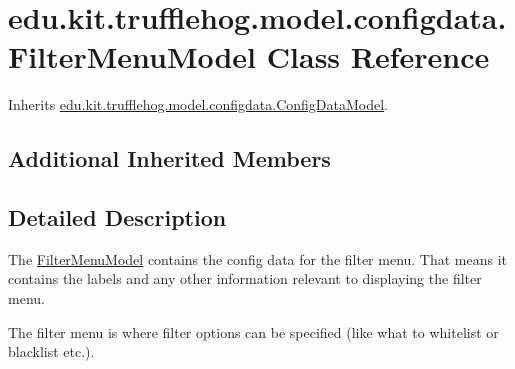 \hypertarget{classedu_1_1kit_1_1trufflehog_1_1model_1_1configdata_1_1_filter_menu_model}{}\section{edu.\+kit.\+trufflehog.\+model.\+configdata.\+Filter\+Menu\+Model Class Reference}
\label{classedu_1_1kit_1_1trufflehog_1_1model_1_1configdata_1_1_filter_menu_model}


Inherits \hyperlink{classedu_1_1kit_1_1trufflehog_1_1model_1_1configdata_1_1_config_data_model}{edu.\+kit.\+trufflehog.\+model.\+configdata.\+Config\+Data\+Model}.

\subsection*{Additional Inherited Members}


\subsection{Detailed Description}
The \hyperlink{classedu_1_1kit_1_1trufflehog_1_1model_1_1configdata_1_1_filter_menu_model}{Filter\+Menu\+Model} contains the config data for the filter menu. That means it contains the labels and any other information relevant to displaying the filter menu. 

The filter menu is where filter options can be specified (like what to whitelist or blacklist etc.). 